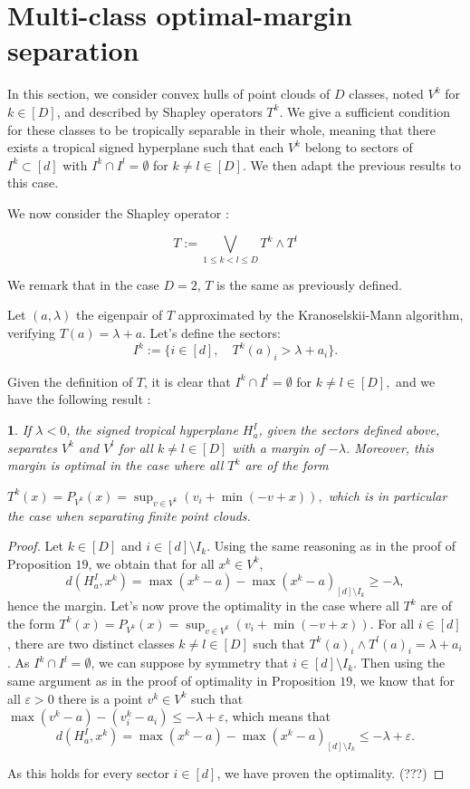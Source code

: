 \documentclass[oneside,english]{amsart}
\numberwithin{equation}{section}
\numberwithin{figure}{section}
\theoremstyle{plain}
\theoremstyle{definition}
\theoremstyle{plain}
\newtheorem{prop}[thm]{\protect\propositionname}
\theoremstyle{remark}
\theoremstyle{plain}
\theoremstyle{definition}
\theoremstyle{definition}
\providecommand{\propositionname}{Proposition}
\begin{document}
\section{Multi-class optimal-margin separation}

In this section, we consider convex hulls of point clouds of $D$ classes, noted $V^k$ for $k\in [D]$, and described by Shapley operators $T^k$. We give a sufficient condition for these classes to be tropically separable in their whole, meaning that there exists a tropical signed hyperplane such that each $V^k$ belong to sectors of $I^k \subset [d]$ with $I^k\cap I^l = \emptyset$ for $k\ne l \in [D].$
We then adapt the previous results to this case.


We now consider the Shapley operator :

$$T := \bigvee_{1\le k < l \le D} T^k \wedge T^l$$

We remark that in the case $D=2$, $T$ is the same as previously defined.

Let $(a,\lambda)$ the eigenpair of $T$ approximated
by the Kranoselskii-Mann algorithm, verifying $T(a)=\lambda+a$. Let's define the sectors:
\[
I^{k}:=\{i\in[d],\quad T^{k}(a)_{i}>\lambda+a_{i}\}.
\]

Given the definition of $T$, it is clear that $I^k\cap I^l = \emptyset$ for $k\ne l \in [D],$ and we have the following result :

\begin{prop}
If $\lambda < 0$, the signed tropical hyperplane $H_{a}^{I}$, given the sectors defined above, separates $V^{k}$ and
$V^{l}$ for all $k\ne l \in [D]$ with a margin of $-\lambda$. Moreover, this margin is optimal in the case where all $T^{k}$ are of the form

$T^{k}(x) = P_{V^{k}}(x) = \sup_{v\in V^{k}} \left( v_i + \min (-v + x)\right),$ which is in particular the case when separating finite point clouds.
\end{prop}

\begin{proof}
    Let $k\in [D]$ and $i \in [d] \setminus I_k$. Using the same reasoning as in the proof of Proposition $19$, we obtain that for all $x^k \in V^k$,  $$d(H_{a}^{I}, x^k) =\max(x^k-a)-\max(x^k-a)_{[d] \setminus I_k} \ge-\lambda,$$ hence the margin. Let's now prove the optimality in the case where all $T^{k}$ are of the form $T^{k}(x) = P_{V^{k}}(x) = \sup_{v\in V^{k}} \left( v_i + \min (-v + x)\right).$ For all $i\in [d]$, there are two distinct classes $k \ne l \in [D]$ such that $T^{k}(a)_i\wedge T^{l}(a)_i = \lambda +a_i$. As $I^k\cap I^l = \emptyset$, we can suppose by symmetry that $i \in [d]\setminus I_k.$ Then using the same argument as in the proof of optimality in Proposition $19$, we know that for all $\varepsilon > 0$ there is a point $v^k \in V^k$ such that $\max(v^k-a)-(v^k_i-a_i) \le - \lambda + \varepsilon$, which means that $$d(H_{a}^{I}, x^k) =\max(x^k-a)-\max(x^k-a)_{[d] \setminus I_k} \le -\lambda + \varepsilon.$$

    As this holds for every sector $i\in [d]$, we have proven the optimality. (???)
\end{proof}
\end{document}

